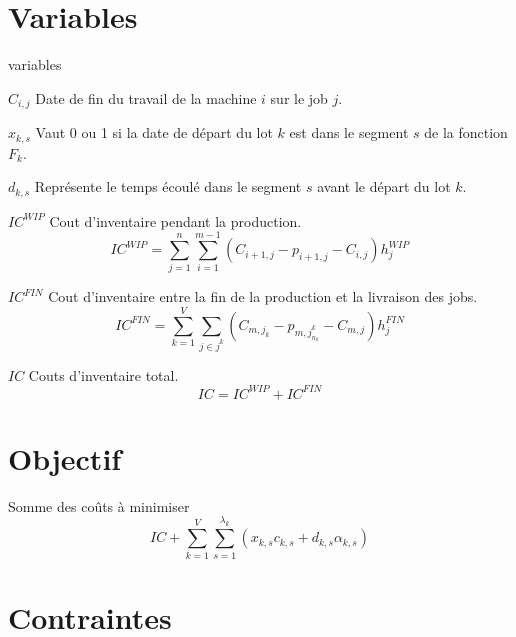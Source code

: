 \section{Variables}

\begin{labeling}{variables}
	\item [$C_{i, j}$]
	Date de fin du travail de la machine $i$ sur le job $j$.
	\item [$x_{k, s}$]
	Vaut 0 ou 1 si la date de départ du lot $k$ est dans le segment $s$ de la fonction $F_k$.
	\item [$d_{k, s}$]
	Représente le temps écoulé dans le segment $s$ avant le départ du lot $k$.
	\item [$IC^{WIP}$]
	Cout d'inventaire pendant la production.
	$$IC^{WIP}=\sum_{j=1}^{n} \sum_{i=1}^{m-1} \left(C_{i+1, j} - p_{i+1, j} - C_{i,j} \right) h_j^{WIP}$$
	\item [$IC^{FIN}$]
	Cout d'inventaire entre la fin de la production et la livraison des jobs.
	$$IC^{FIN} = \sum_{k=1}^{V} \sum _{j\in j^k} \left(C_{m, j_k} - p_{m, j_{n_k}^k} - C_{m, j} \right) h_j^{FIN}$$
	\item [$IC$]
	Couts d'inventaire total.
	$$IC = IC^{WIP} + IC^{FIN}$$
\end{labeling}


\section{Objectif}
Somme des coûts à minimiser
$$IC + \sum_{k=1}^{V} \sum_{s=1}^{\lambda_k} \left(x_{k, s} c_{k, s}+ d_{k,s} \alpha_{k, s} \right)$$

\section{Contraintes}

